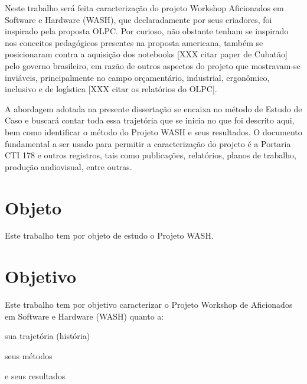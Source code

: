 \documentclass[
12pt,		%
openright,	%
twoside,  %
a4paper,			%
chapter=TITLE,		%
english,			%
french,				%
spanish,			%
brazil				%
]{USPSC-classe/USPSC_RedarTex}
\begin{document}
Neste trabalho ser\'a feita caracteriza\c{c}\~ao do projeto Workshop Aficionados em Software e Hardware (WASH), que declaradamente por seus criadores, foi inspirado pela proposta OLPC. Por curioso, n\~ao obstante tenham se inspirado nos conceitos pedag\'ogicos presentes na proposta americana, tamb\'em se posicionaram contra a aquisi\c{c}\~ao dos notebooks [XXX citar paper de Cubat\~ao] pelo governo brasileiro, em raz\~ao de outros aspectos do projeto que mostravam-se invi\'aveis, principalmente no campo or\c{c}ament\'ario, industrial, ergon\^omico, inclusivo e de log\'{\i}stica [XXX citar os relat\'orios do OLPC].








A abordagem adotada na presente disserta\c{c}\~ao se encaixa no m\'etodo de \textquotedbl Estudo de Caso e buscar\'a contar toda essa trajet\'oria que se inicia no que foi descrito aqui, bem como identificar o m\'etodo do Projeto WASH e seus resultados. O documento fundamental a ser usado para permitir a caracteriza\c{c}\~ao do projeto \'e a Portaria CTI 178 e outros registros, tais como publica\c{c}\~oes, relat\'orios, planos de trabalho, produ\c{c}\~ao audiovisual, entre outras.








\section[Objeto]{Objeto}\label{Objeto}
Este trabalho tem por objeto de estudo o  Projeto WASH.








\section[Objetivo]{Objetivo}\label{Objetivo}
Este trabalho tem por objetivo caracterizar  o Projeto Workshop de Aficionados em Software e Hardware (WASH) quanto a:









\begin{alineas}
\item sua trajet\'oria (hist\'oria)
\item seus m\'etodos
\item e seus resultados
\end{alineas}
\end{document}
